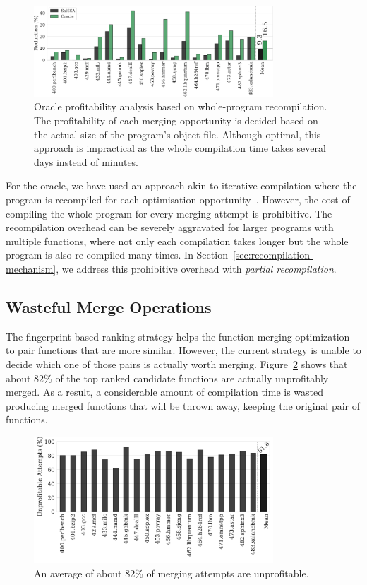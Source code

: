 \begin{figure}[h]
  \centering
  \includegraphics[width=0.8\textwidth]{src/deeplearning/figs/motivation-oracle-2-reduction.pdf}
  \caption{Oracle profitability analysis based on whole-program recompilation. The profitability of each merging opportunity is decided based on the actual size of the program's object file. Although optimal, this approach is impractical as the whole compilation time takes several days instead of minutes.}
  \label{fig:oracle-reduction}
\end{figure}

For the oracle, we have used an approach akin to iterative compilation where the program is recompiled for each optimisation opportunity~\cite{kisuki99,kisuki00,knijnenburg04}.
However, the cost of compiling the whole program for every merging attempt is prohibitive.
The recompilation overhead can be severely aggravated for larger programs with multiple functions, where not only each compilation takes longer but the whole program is also re-compiled many times.
In Section~\ref{sec:recompilation-mechanism}, we address this prohibitive overhead with \textit{partial recompilation}.

\subsection{Wasteful Merge Operations}

The fingerprint-based ranking strategy helps the function merging optimization to pair functions that are more similar.
However, the current strategy is unable to decide which one of those pairs is actually worth merging.
Figure~\ref{fig:unprofitable-attempts} shows that about 82\% of the top ranked candidate functions are actually unprofitably merged.
As a result, a considerable amount of compilation time is wasted producing merged functions that will be thrown away, keeping the original pair of functions.

\begin{figure}[h]
  \centering
  \includegraphics[width=0.8\textwidth]{src/deeplearning/figs/unprofitable-attempts.pdf}
  \caption{An average of about 82\% of merging attempts are unprofitable.}
  \label{fig:unprofitable-attempts}
\end{figure}

